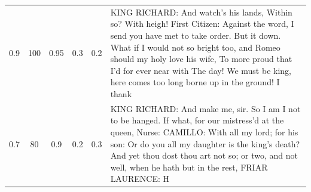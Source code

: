 \documentclass[11pt]{book}
\newcommand{\clearemptydoublepage}{\newpage{\pagestyle{empty}\cleardoublepage}}
\begin{document}
\begin{longtable}{ccccc p{12cm}}
    0.9 & 100 & 0.95 & 0.3 & 0.2 &
    KING RICHARD:\newline
    And watch's his lands,\newline
    Within so?\newline
    With heigh!\newline
    First Citizen:\newline
    Against the word, I send you have met to take order.\newline
    But it down.\newline
    What if I would not so bright too, and Romeo should my holy love his wife,\newline
    To more proud that I'd for ever near with\newline
    The day! We must be king, here comes too long borne up in the ground!\newline
    I thank\\
    
    0.7 & 80 & 0.9 & 0.2 & 0.3 &
    KING RICHARD:\newline
    And make me, sir.\newline
    So I am I not to be hanged.\newline
    If what, for our mistress'd at the queen,\newline
    Nurse:\newline
    CAMILLO:\newline
    With all my lord; for his son:\newline
    Or do you all my daughter is the king's death?\newline
    And yet thou dost thou art not so; or two, and not well, when he hath but in the rest,\newline
    FRIAR LAURENCE:\newline
    H\\
    
    \end{longtable}
    


\clearemptydoublepage
\end{document}
